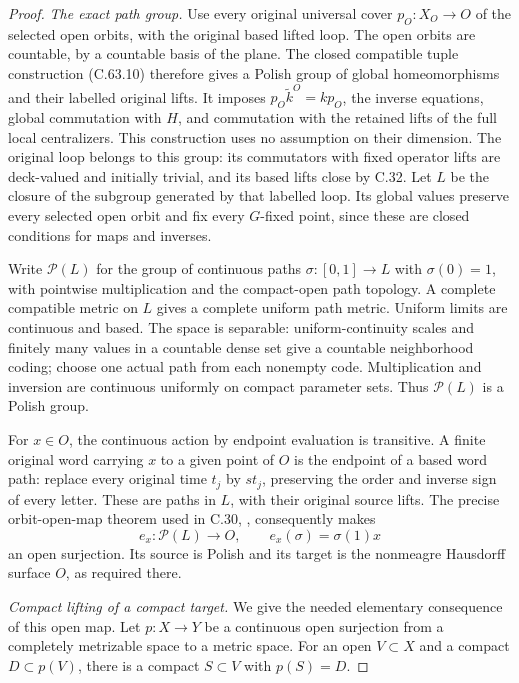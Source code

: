 \begin{proof}
\emph{The exact path group.}
Use every original universal cover $p_O:X_O\to O$ of the selected
open orbits, with the original based lifted loop. The open orbits
are countable, by a countable basis of the plane. The closed
compatible tuple construction (C.63.10) therefore gives a Polish
group of global homeomorphisms and their labelled original lifts.
It imposes $p_O\widetilde k^O=kp_O$, the inverse equations,
global commutation with $H$, and commutation with the retained
lifts of the full local centralizers. This construction uses
no assumption on their dimension. The original loop belongs
to this group: its commutators with fixed operator lifts are
deck-valued and initially trivial, and its based lifts close
by C.32. Let $L$ be the closure of the subgroup generated by
that labelled loop. Its global values preserve every selected
open orbit and fix every $G$-fixed point, since these are closed
conditions for maps and inverses.

Write $\mathscr P(L)$ for the group of continuous paths
$\sigma:[0,1]\to L$ with $\sigma(0)=1$, with pointwise
multiplication and the compact-open path topology. A complete
compatible metric on $L$ gives a complete uniform path metric.
Uniform limits are continuous and based. The space is separable:
uniform-continuity scales and finitely many values in a countable
dense set give a countable neighborhood coding; choose one actual
path from each nonempty code. Multiplication and inversion are
continuous uniformly on compact parameter sets. Thus
$\mathscr P(L)$ is a Polish group.

For $x\in O$, the continuous action by endpoint evaluation is
transitive. A finite original word carrying $x$ to a given point
of $O$ is the endpoint of a based word path: replace every
original time $t_j$ by $s t_j$, preserving the order and inverse
sign of every letter. These are paths in $L$, with their original
source lifts. The precise orbit-open-map theorem used in C.30,
\cite[Theorem~3.5]{C_GomezPinedoUzcategui2017}, consequently makes
\[
 e_x:\mathscr P(L)\longrightarrow O,\qquad
                 e_x(\sigma)=\sigma(1)x                 \tag{C.64.4}
\]
an open surjection. Its source is Polish and its target is the
nonmeagre Hausdorff surface $O$, as required there.

\emph{Compact lifting of a compact target.}
We give the needed elementary consequence of this open map.
Let $p:X\to Y$ be a continuous open surjection from a completely
metrizable space to a metric space. For an open $V\subset X$
and a compact $D\subset p(V)$, there is a compact
$S\subset V$ with $p(S)=D$.


\end{proof}
